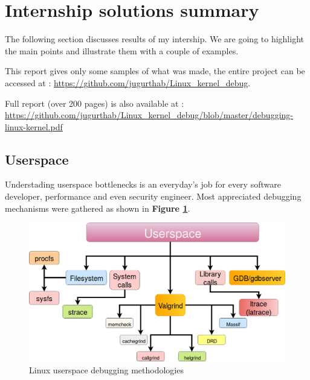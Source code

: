 \section{Internship solutions summary}
The following section discusses results of my intership. We are going to highlight the main points and illustrate them with a couple of examples.

\begin{center}
\begin{mdframed}[
        linecolor=red,linewidth=2pt,%
        frametitlerule=true,%
        apptotikzsetting={\tikzset{mdfframetitlebackground/.append style={%
            shade,left color=white, right color=blue!20}}}, 
        frametitlerulecolor=blue,
        frametitlerulewidth=1pt, innertopmargin=\topskip,
        frametitle={About report},
        outerlinewidth=1.25pt
    ]
			This report gives only some samples of what was made, the entire project can be accessed at : {\color{blue}\url{https://github.com/jugurthab/Linux_kernel_debug}}.
			
			Full report (over 200 pages) is also available at : {\color{blue}\url{https://github.com/jugurthab/Linux_kernel_debug/blob/master/debugging-linux-kernel.pdf}}
\end{mdframed}
\end{center}




\subsection{Userspace}
Understading userspace bottlenecks is an everyday's job for every software developer, performance and even security engineer. Most appreciated debugging mechanisms were gathered as shown in \textbf{Figure \ref{Linux userspace debugging methodologies}}.
\begin{figure}[H]
		\centering
        \includegraphics[scale=0.40]{img/solution/userspace.png}
        \caption{Linux userspace debugging methodologies}
        \label{Linux userspace debugging methodologies}
    \end{figure}
 
